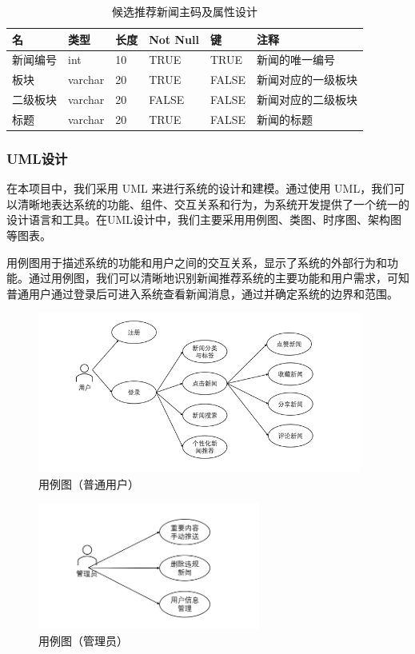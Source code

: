 \documentclass[withoutpreface,bwprint]{cumcmthesis} %
\begin{document}
	\begin{table}[!ht]
		\centering
		\caption{候选推荐新闻主码及属性设计}
		\begin{tabular}{|l|l|l|l|l|l|}
			\hline
			\textbf{名} & \textbf{类型} & \textbf{长度} & \textbf{Not Null} & \textbf{键} & \textbf{注释 } \\ \hline
			新闻编号 & int & 10 & TRUE & TRUE & 新闻的唯一编号  \\ \hline
			板块 & varchar & 20 & TRUE & FALSE & 新闻对应的一级板块  \\ \hline
			二级板块 & varchar & 20 & FALSE & FALSE & 新闻对应的二级板块  \\ \hline
			标题 & varchar & 20 & TRUE & FALSE & 新闻的标题  \\ \hline
		\end{tabular}
	\end{table}
	
	
	
	
	\subsubsection{ UML设计}
	在本项目中，我们采用 UML 来进行系统的设计和建模。通过使用 UML，我们可以清晰地表达系统的功能、组件、交互关系和行为，为系统开发提供了一个统一的设计语言和工具。在UML设计中，我们主要采用用例图、类图、时序图、架构图等图表。\par
	用例图用于描述系统的功能和用户之间的交互关系，显示了系统的外部行为和功能。通过用例图，我们可以清晰地识别新闻推荐系统的主要功能和用户需求，可知普通用户通过登录后可进入系统查看新闻消息，通过并确定系统的边界和范围。\par
	\begin{figure}[H]
		\centering
		\includegraphics[width=0.95\textwidth]{用例图（普通用户）}
		\caption{用例图（普通用户）}
		\label{fig:circuit-diagcam}
	\end{figure}
	\begin{figure}[H]
		\centering
		\includegraphics[width=0.65\textwidth]{用例图（管理员）}
		\caption{用例图（管理员）}
		\label{fig:circuit-diagcam}
	\end{figure}
	
\end{document}
